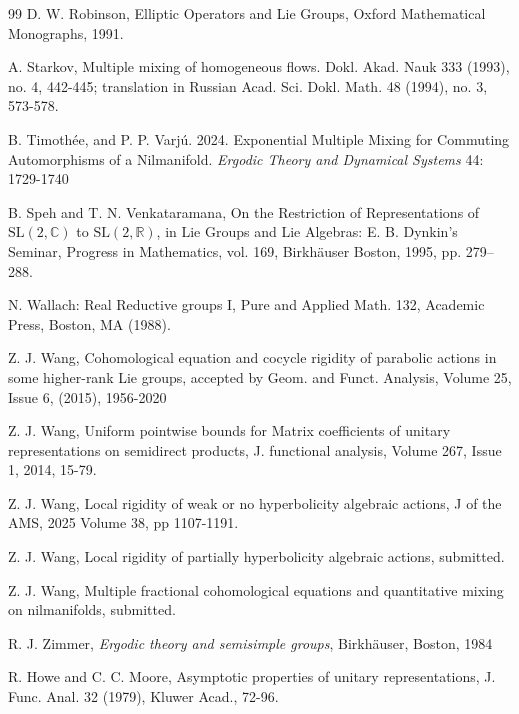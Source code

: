 \documentclass[11 pt]{amsart}
\theoremstyle{definition}
\numberwithin{equation}{section}
\begin{document}
\begin{thebibliography}{99}
 D. W. Robinson, Elliptic Operators and Lie Groups, Oxford Mathematical Monographs, 1991.





 A. Starkov, Multiple mixing of homogeneous flows. Dokl. Akad. Nauk 333 (1993), no. 4, 442-445; translation
in Russian Acad. Sci. Dokl. Math. 48 (1994), no. 3, 573-578.

 B. Timoth\'ee, and P. P. Varj\'u. 2024. Exponential Multiple Mixing for Commuting Automorphisms of a Nilmanifold.  \emph{Ergodic Theory and Dynamical Systems} 44: 1729-1740

 B. Speh and T. N. Venkataramana, On the Restriction of Representations of $\mathrm{SL}(2,\mathbb{C})$ to $\mathrm{SL}(2,\mathbb{R})$, in Lie Groups and Lie Algebras: E. B. Dynkin's Seminar, Progress in Mathematics, vol. 169, Birkhäuser Boston, 1995, pp. 279–288.


 N. Wallach: Real Reductive groups I, Pure and Applied Math. 132, Academic Press,
Boston, MA (1988).

 Z. J. Wang, Cohomological equation and cocycle rigidity of parabolic actions in some higher-rank Lie groups, accepted by Geom. and Funct. Analysis, Volume 25, Issue 6, (2015), 1956-2020

Z. J. Wang, Uniform pointwise bounds for Matrix coefficients of unitary representations on
semidirect products, J. functional analysis, Volume 267, Issue 1, 2014, 15-79.



 Z. J. Wang, Local rigidity of weak or no hyperbolicity algebraic actions, J of the AMS, 2025 Volume 38, pp 1107-1191.

 Z. J. Wang, Local rigidity of partially hyperbolicity algebraic actions, submitted.

 Z. J. Wang, Multiple fractional cohomological equations and quantitative mixing on nilmanifolds, submitted.


 R. J. Zimmer, {\em Ergodic theory and semisimple groups},
Birkh\"{a}user, Boston,  1984

R. Howe and C. C. Moore, Asymptotic properties of unitary representations, J. Func. Anal. 32
(1979), Kluwer Acad., 72-96.




\end{thebibliography}
\end{document}
